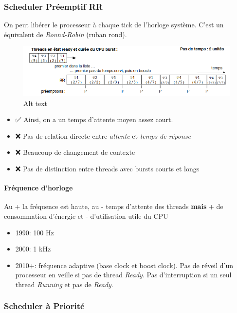 \subsubsection{Scheduler Préemptif RR}\label{scheduler-pruxe9emptif-rr}

On peut libérer le processeur à chaque tick de l'horloge système. C'est
un équivalent de \emph{Round-Robin} (ruban rond).

\begin{figure}
\centering
\includegraphics{image-32.png}
\caption{Alt text}
\end{figure}

\begin{itemize}
\tightlist
\item
  ✅ Ainsi, on a un temps d'attente moyen assez court.
\item
  ❌ Pas de relation directe entre \emph{attente} et \emph{temps de
  réponse}
\item
  ❌ Beaucoup de changement de contexte
\item
  ❌ Pas de distinction entre threads avec bursts courts et longs
\end{itemize}

\paragraph{Fréquence d'horloge}\label{fruxe9quence-dhorloge}

Au + la fréquence est haute, au - temps d'attente des threads
\textbf{mais} + de consommation d'énergie et - d'utilisation utile du
CPU

\begin{itemize}
\tightlist
\item
  1990: 100 Hz
\item
  2000: 1 kHz
\item
  2010+: fréquence adaptive (base clock et boost clock). Pas de réveil
  d'un processeur en veille si pas de thread \emph{Ready}. Pas
  d'interruption si un seul thread \emph{Running} et pas de
  \emph{Ready}.
\end{itemize}

\subsubsection{Scheduler à Priorité}\label{scheduler-uxe0-priorituxe9}

